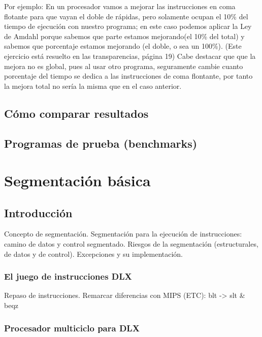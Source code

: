 \documentclass[12pt,onecolumn]{memoir}
\begin{document}
Por ejemplo: En un procesador vamos a mejorar las instrucciones en coma flotante para
que vayan el doble de rápidas, pero solamente ocupan el 10\% del tiempo de ejecución 
con nuestro programa; en este caso podemos aplicar la Ley de Amdahl porque sabemos que
parte estamos mejorando(el 10\% del total) y sabemos que porcentaje estamos mejorando
(el doble, o sea un 100\%).
(Este ejercicio está resuelto en las transparencias, página 19) %
Cabe destacar que que la mejora no es global, pues al usar otro programa, seguramente
cambie cuanto porcentaje del tiempo se dedica a las instrucciones de coma flontante,
por tanto la mejora total no sería la misma que en el caso anterior.

\section{Cómo comparar resultados}

\section{Programas de prueba (benchmarks)}


\chapter{Segmentación básica}
\label{cap:segmentado}


\section{Introducción}
\label{sec:introduccion_segmentado}

Concepto de segmentación. Segmentación para la ejecución de
instrucciones: camino de datos y control segmentado. Riesgos de la
segmentación (estructurales, de datos y de control). Excepciones y su
implementación.

\subsection{El juego de instrucciones DLX}

Repaso de instrucciones. Remarcar diferencias con MIPS (ETC): blt -> slt \& beqz

\subsection{Procesador multiciclo para DLX}
\end{document}
